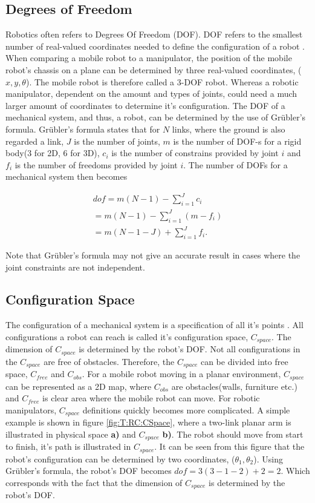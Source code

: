\subsection{Degrees of Freedom}
Robotics often refers to Degrees Of Freedom (DOF). DOF refers to the smallest number of real-valued coordinates needed to define the configuration of a robot \cite{LynchKevin2017Mr:m}. When comparing a mobile robot to a manipulator, the position of the mobile robot's chassis on a plane can be determined by three real-valued coordinates, ($x,y,\theta$). The mobile robot is therefore called a 3-DOF robot. Whereas a robotic manipulator, dependent on the amount and types of joints, could need a much larger amount of coordinates to determine it's configuration. The DOF of a mechanical system, and thus, a robot, can be determined by the use of Gr\"{u}bler's formula.  Gr\"{u}bler's formula states that for $N$ links, where the ground is also regarded a link, $J$ is the number of joints, $m$ is the number of DOF-s for a rigid body(3 for 2D, 6 for 3D), $c_i$ is the number of constrains  provided by joint $i$ and $f_i$ is the number of freedoms provided by joint $i$. The number of DOFs for a mechanical system then becomes

\begin{align}
\label{ec:DOFs}
    dof = m(N-1) -  \sum_{i=1}^{J} c_i \\
    = m(N-1) - \sum_{i=1}^{J}(m-f_i) \\
    = m(N-1-J) + \sum_{i=1}^{J}f_i.
\end{align}

Note that Gr\"ubler's formula may not give an accurate result in cases where the joint constraints are not independent\cite{LynchKevin2017Mr:m}.

\subsection{Configuration Space}
The configuration of a mechanical system is a specification of all it's points \cite{LynchKevin2017Mr:m}. All configurations a robot can reach is called it's configuration space, $C_{space}$. The dimension of $C_{space}$ is determined by the robot's DOF. Not all configurations in the $C_{space}$ are free of obstacles. Therefore, the $C_{space}$ can be divided into free space, $C_{free}$ and $C_{obs}$. For a mobile robot moving in a planar environment, $C_{space}$ can be represented as a 2D map, where $C_{obs}$ are obstacles(walls, furniture etc.) and $C_{free}$ is clear area where the mobile robot can move. For robotic manipulators, $C_{space}$ definitions quickly becomes more complicated. A simple example is shown in figure \ref{fig:T:RC:CSpace}, where a two-link planar arm is illustrated in physical space \textbf{a)} and $C_{space}$ \textbf{b)}. The robot should move from start to finish, it's path is illustrated in $C_{space}$. It can be seen from this figure that the robot's configuration can be determined by two coordinates, ($\theta_1, \theta_2$). Using Gr\"ubler's formula, the robot's DOF becomes $dof=3(3-1-2)+2=2$. Which corresponds with the fact that the dimension of $C_{space}$ is determined by the robot's DOF.

